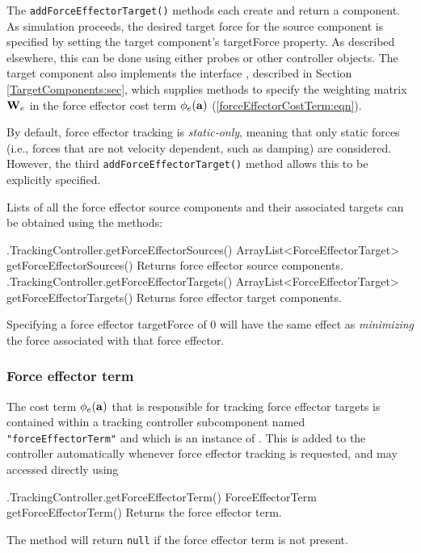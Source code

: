 The {\tt addForceEffectorTarget()} methods each create and return a
 component. 
As simulation proceeds, the desired target force for the source component is
specified by setting the target component's {\sf targetForce} property.  As
described elsewhere, this can be done using either probes or other controller
objects.  The target component also implements the interface
, described in
Section \ref{TargetComponents:sec}, which supplies methods to specify the
weighting matrix ${\bf W}_e$ in the force effector cost term $\phi_e({\bf a})$
(\ref{forceEffectorCostTerm:eqn}).

By default, force effector tracking is {\it static-only}, meaning that only
static forces (i.e., forces that are not velocity dependent, such as damping)
are considered.  However, the third {\tt addForceEffectorTarget()} method
allows this to be explicitly specified.

\iflatexml\else\clearpage\fi

Lists of all the force effector source components and their associated targets
can be obtained using the methods:
%
\begin{methodtable}{0.6}{0.4}
\midline
%
\methodentry
{\inverse.TrackingController.getForceEffectorSources()}%
{ArrayList<ForceEffectorTarget> getForceEffectorSources()}%
{Returns force effector source components.}%
%
\methodentry
{\inverse.TrackingController.getForceEffectorTargets()}%
{ArrayList<ForceEffectorTarget> getForceEffectorTargets()}%
{Returns force effector target components.}%
%
\midline
\end{methodtable}
%

\begin{sideblock}
Specifying a force effector {\sf targetForce} of 0 will have the
same effect as {\it minimizing} the force associated with that force effector.
\end{sideblock}

\subsubsection{Force effector term}
\label{ForceEffectorTerm:sec}

The cost term $\phi_e({\bf a})$ that is responsible for tracking force effector
targets is contained within a tracking controller subcomponent named
{\tt "forceEffectorTerm"} and which is an instance of
. 
This is added to the controller automatically whenever force effector tracking
is requested, and may accessed directly using
%
\begin{methodtable}{0.6}{0.4}
\midline
%
\methodentry
{\inverse.TrackingController.getForceEffectorTerm()}%
{ForceEffectorTerm getForceEffectorTerm()}%
{Returns the force effector term.}%
%
\midline
\end{methodtable}
%
The method will return {\tt null} if the force effector term is not present.

